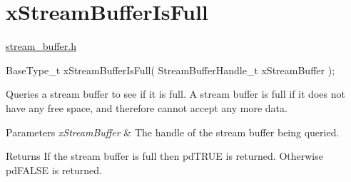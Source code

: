 \hypertarget{group__x_stream_buffer_is_full}{}\section{x\+Stream\+Buffer\+Is\+Full}
\label{group__x_stream_buffer_is_full}
\mbox{\hyperlink{stream__buffer_8h_source}{stream\+\_\+buffer.\+h}}


\begin{DoxyPre}
BaseType\_t xStreamBufferIsFull( StreamBufferHandle\_t xStreamBuffer );
\end{DoxyPre}


Queries a stream buffer to see if it is full. A stream buffer is full if it does not have any free space, and therefore cannot accept any more data.


\begin{DoxyParams}{Parameters}
{\em x\+Stream\+Buffer} & The handle of the stream buffer being queried.\\
\hline
\end{DoxyParams}
\begin{DoxyReturn}{Returns}
If the stream buffer is full then pd\+T\+R\+UE is returned. Otherwise pd\+F\+A\+L\+SE is returned. 
\end{DoxyReturn}

